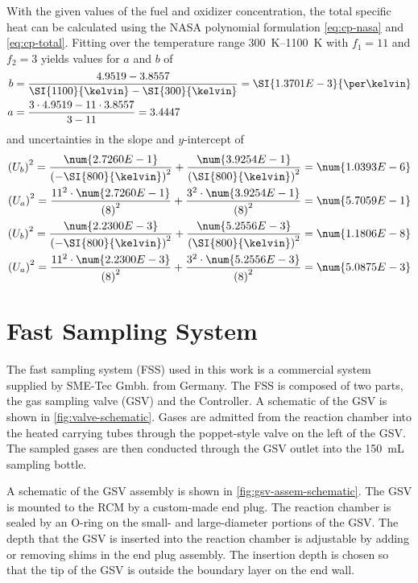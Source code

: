 \documentclass[../main.tex]{subfiles}
\begin{document}
With the given values of the fuel and oxidizer concentration, the total
specific heat can be calculated using the NASA polynomial formulation
\cref{eq:cp-nasa} and \cref{eq:cp-total}. Fitting over the temperature
range \SIrange{300}{1100}{\kelvin} with $f_1 = 11$ and $f_2 = 3$ yields
values for $a$ and $b$ of
%
\begin{align*}
b &= \frac{4.9519 - 3.8557}{\SI{1100}{\kelvin} - \SI{300}{\kelvin}} = \SI{1.3701E-3}{\per\kelvin} \\
a &= \frac{3 \cdot 4.9519 - 11 \cdot 3.8557}{3 - 11} = 3.4447
\end{align*}
%
and uncertainties in the slope and $y$-intercept of
%
\begin{align*}
\left(U_{b}\right)^2 = \frac{\num{2.7260E-1}}{\left(-\SI{800}{\kelvin}\right)^2} + \frac{\num{3.9254E-1}}{\left(\SI{800}{\kelvin}\right)^2} = \num{1.0393E-6} \\
\left(U_{a}\right)^2 = \frac{11^2\cdot\num{2.7260E-1}}{\left(8\right)^2} + \frac{3^2\cdot\num{3.9254E-1}}{\left(8\right)^2} = \num{5.7059E-1} \\
\left(U_{b}\right)^2 = \frac{\num{2.2300E-3}}{\left(-\SI{800}{\kelvin}\right)^2} + \frac{\num{5.2556E-3}}{\left(\SI{800}{\kelvin}\right)^2} = \num{1.1806E-8} \\
\left(U_{a}\right)^2 = \frac{11^2\cdot\num{2.2300E-3}}{\left(8\right)^2} + \frac{3^2\cdot\num{5.2556E-3}}{\left(8\right)^2} = \num{5.0875E-3}
\end{align*}

\section{Fast Sampling System}
\label{sec:fast-sampling}

The fast sampling system (FSS) used in this work is a commercial system supplied by
SME-Tec Gmbh. from Germany. The FSS is composed of two parts, the gas sampling valve
(GSV) and the Controller. A schematic of the GSV is shown in \cref{fig:valve-schematic}.
Gases are admitted from the reaction chamber into the heated carrying tubes
through the poppet-style valve on the left of the GSV. The sampled gases are then
conducted through the GSV outlet into the \SI{150}{\milli\liter} sampling bottle.

A schematic of the GSV assembly is shown in \cref{fig:gsv-assem-schematic}.
The GSV is mounted to the RCM by a custom-made end plug. The reaction chamber
is sealed by an O-ring on the small- and large-diameter portions of the GSV.
The depth that the GSV is inserted into the reaction chamber is adjustable
by adding or removing shims in the end plug assembly. The insertion depth
is chosen so that the tip of the GSV is outside the boundary layer on the
end wall.
\end{document}
